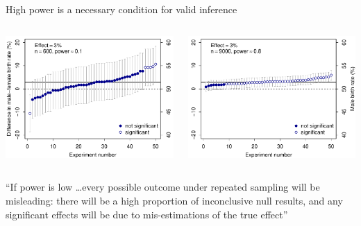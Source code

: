 \documentclass[aspectratio=169]{beamer}
\begin{document}
\begin{frame}{High power is a necessary condition for valid inference}

\begin{columns}
\begin{column}{7.9cm}
\includegraphics[width=7.9cm]{../figures/birthdiff10}
\end{column}
%
\begin{column}{7.9cm}
\includegraphics[width=7.9cm]{../figures/birthdiff80}
\end{column}
\end{columns}

\vspace{2ex}

``If power is low \dots every possible outcome under repeated sampling will
be misleading: there will be a high proportion of inconclusive null results,
and any significant effects will be due to mis-estimations of the true
effect'' \citep[][p.~1317]{VasishthGelman21}

\end{frame}
\end{document}
